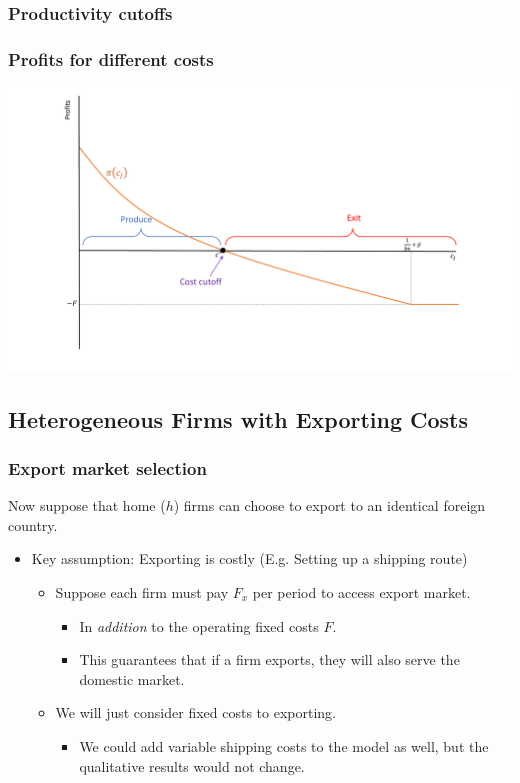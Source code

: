 \documentclass{beamer}
\begin{document}
\begin{frame}
	\frametitle{Productivity cutoffs}
	
			\frametitle{Profits for different costs}
			\includegraphics[scale=0.32]{SL4_7.pdf}
	
\end{frame}

\subsection{Heterogeneous Firms with Exporting Costs}
\begin{frame}
	\frametitle{Export market selection}
Now suppose that home ($h$) firms can choose to export to an identical foreign country. 
	\begin{itemize}
		\item Key assumption: Exporting is costly (E.g. Setting up a shipping route)
			\begin{itemize}
				\item Suppose each firm must pay $F_x$ per period to access export market.
					\begin{itemize}
						\item In \emph{addition} to the operating fixed costs $F$.
						\item This guarantees that if a firm exports, they will also serve the domestic market. 
					\end{itemize}
				\item We will just consider fixed costs to exporting.
					\begin{itemize}
						\item We could add variable shipping costs to the model as well, but the qualitative results would not change. 
					\end{itemize}
			\end{itemize}
	\end{itemize}
\end{frame}
\end{document}
